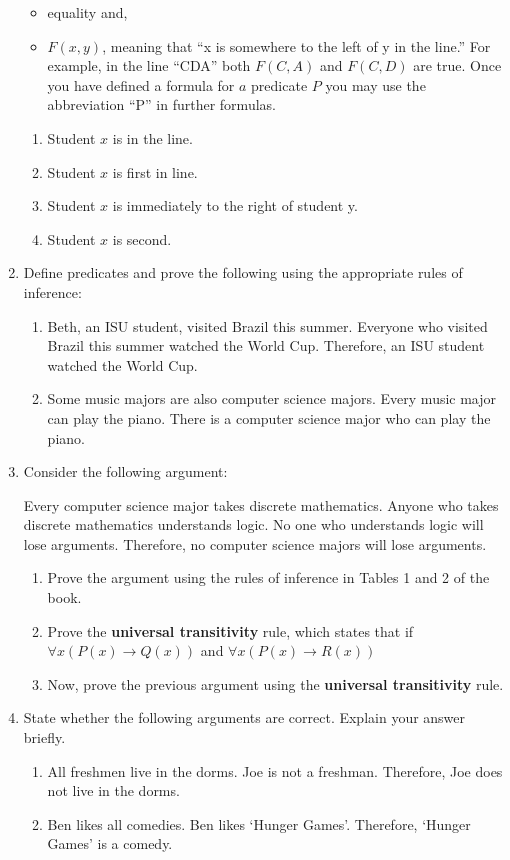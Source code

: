 \documentclass[12pt]{article}
\begin{document}
\begin{enumerate}
\begin{itemize}
\item equality and,
\item $F(x, y)$, meaning that ``x is somewhere to the left of y in the line.'' For example, in the line ``CDA'' both $F(C,A)$ and $F(C,D)$ are true. Once you have defined a formula for $a$ predicate $P$ you may use the abbreviation ``P'' in further formulas.
\end{itemize}
\begin{enumerate}
\item Student $x$ is in the line.\\
\item Student $x$ is first in line.\\
\item Student $x$ is immediately to the right of student y.\\
\item Student $x$ is second.\\
\end{enumerate}
 \item  Define predicates and prove the following using the appropriate rules of inference:
\begin{enumerate}
    \item Beth, an ISU student, visited Brazil this summer. Everyone who visited Brazil this summer watched the World Cup. Therefore, an ISU student watched the World Cup.
    \item Some music majors are also computer science majors. Every music major can play the piano. There is a computer science major who can play the piano.
\end{enumerate}
\item Consider the following argument:\\
\begin{itshape}
Every computer science major takes discrete mathematics. Anyone who takes discrete mathematics understands logic. No one who understands logic will lose arguments. Therefore, no computer science majors will lose arguments.
\end{itshape}
\begin{enumerate}
\item Prove the argument using the rules of inference in Tables 1 and 2 of the book.
\item Prove the \textbf{universal transitivity} rule, which states that if $\forall x(P(x)\to Q(x))$ and $\forall x(P(x)\to R(x))$
\item Now, prove the previous argument using the \textbf{universal transitivity} rule.
\end{enumerate}
\item State whether the following arguments are correct. Explain your answer briefly.
\begin{enumerate}
\item All freshmen live in the dorms. Joe is not a freshman. Therefore, Joe does not live in the dorms.
\item  Ben likes all comedies. Ben likes ‘Hunger Games’. Therefore, ‘Hunger Games’ is a comedy.
\end{enumerate}

\end{enumerate}
\end{document}
